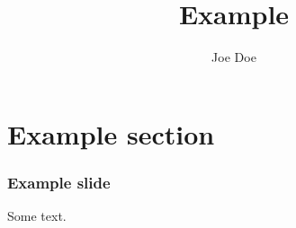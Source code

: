 \documentclass{beamer}
\title{Example}
\author{Joe Doe}
\begin{document}
\section{Example section}

\begin{frame}
    \sectionpage
\end{frame}

\begin{frame}
  \frametitle{Example slide}
  Some text.
  \end{frame}
\end{document}
